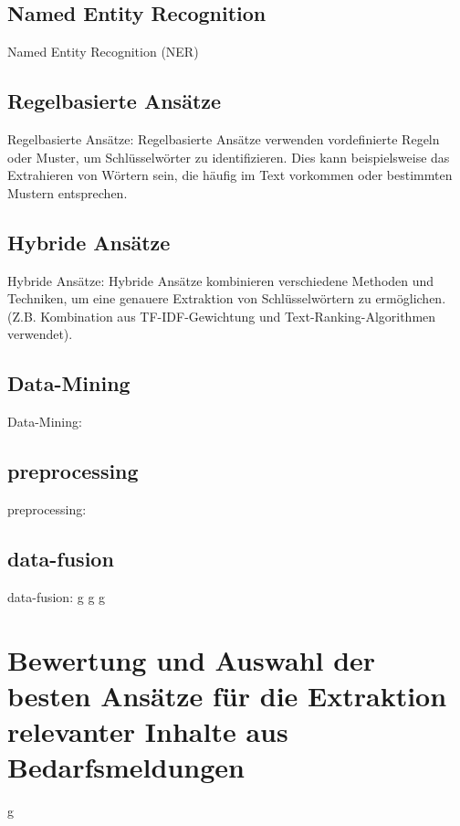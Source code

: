 \subsection{Named Entity Recognition}
Named Entity Recognition (NER) \cite{mansouri2008named} \cite{nadeau2007survey}\cite{partalidou2019design}\\

\subsection{Regelbasierte Ansätze}
Regelbasierte Ansätze: Regelbasierte Ansätze verwenden vordefinierte Regeln oder Muster, um Schlüsselwörter zu identifizieren. Dies kann beispielsweise das Extrahieren von Wörtern sein, die häufig im Text vorkommen oder bestimmten Mustern entsprechen.\\

\subsection{Hybride Ansätze}
Hybride Ansätze: Hybride Ansätze kombinieren verschiedene Methoden und Techniken, um eine genauere Extraktion von Schlüsselwörtern zu ermöglichen. (Z.B. Kombination aus TF-IDF-Gewichtung und Text-Ranking-Algorithmen verwendet).\cite{darmawan2015hybrid} \\

\subsection{Data-Mining}
Data-Mining: \cite{jun2001review}\cite{jain2013data}

\subsection{preprocessing}
preprocessing: \cite{garcia2016big}

\subsection{data-fusion}
data-fusion: \cite{famili1997data} \cite{frank2005comparing} \cite{bohne2013data}
\newpage
g
\newpage
g
\newpage
g
\newpage

\section{Bewertung und Auswahl der besten Ansätze für die Extraktion relevanter Inhalte aus Bedarfsmeldungen}

\newpage
g
\newpage